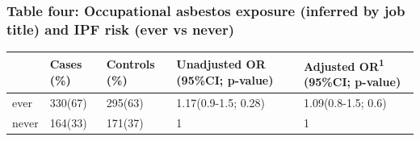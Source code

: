 \documentclass[
]{article}
\begin{document}
\hypertarget{table-four-occupational-asbestos-exposure-inferred-by-job-title-and-ipf-risk-ever-vs-never}{%
\subsubsection{Table four: Occupational asbestos exposure (inferred by
job title) and IPF risk (ever vs
never)}\label{table-four-occupational-asbestos-exposure-inferred-by-job-title-and-ipf-risk-ever-vs-never}}

\begin{longtable}[]{@{}lllll@{}}
\toprule
\begin{minipage}[b]{0.06\columnwidth}\raggedright
\strut
\end{minipage} & \begin{minipage}[b]{0.10\columnwidth}\raggedright
Cases (\%)\strut
\end{minipage} & \begin{minipage}[b]{0.12\columnwidth}\raggedright
Controls (\%)\strut
\end{minipage} & \begin{minipage}[b]{0.29\columnwidth}\raggedright
Unadjusted OR (95\%CI; p-value)\strut
\end{minipage} & \begin{minipage}[b]{0.28\columnwidth}\raggedright
Adjusted OR\textsuperscript{1} (95\%CI; p-value)\strut
\end{minipage}\tabularnewline
\midrule
\endhead
\begin{minipage}[t]{0.06\columnwidth}\raggedright
ever\strut
\end{minipage} & \begin{minipage}[t]{0.10\columnwidth}\raggedright
330(67)\strut
\end{minipage} & \begin{minipage}[t]{0.12\columnwidth}\raggedright
295(63)\strut
\end{minipage} & \begin{minipage}[t]{0.29\columnwidth}\raggedright
1.17(0.9-1.5; 0.28)\strut
\end{minipage} & \begin{minipage}[t]{0.28\columnwidth}\raggedright
1.09(0.8-1.5; 0.6)\strut
\end{minipage}\tabularnewline
\begin{minipage}[t]{0.06\columnwidth}\raggedright
never\strut
\end{minipage} & \begin{minipage}[t]{0.10\columnwidth}\raggedright
164(33)\strut
\end{minipage} & \begin{minipage}[t]{0.12\columnwidth}\raggedright
171(37)\strut
\end{minipage} & \begin{minipage}[t]{0.29\columnwidth}\raggedright
1\strut
\end{minipage} & \begin{minipage}[t]{0.28\columnwidth}\raggedright
1\strut
\end{minipage}\tabularnewline
\bottomrule
\end{longtable}
\end{document}
